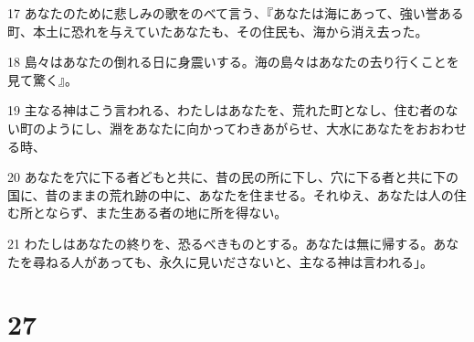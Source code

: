 \par 17 あなたのために悲しみの歌をのべて言う、『あなたは海にあって、強い誉ある町、本土に恐れを与えていたあなたも、その住民も、海から消え去った。
\par 18 島々はあなたの倒れる日に身震いする。海の島々はあなたの去り行くことを見て驚く』。
\par 19 主なる神はこう言われる、わたしはあなたを、荒れた町となし、住む者のない町のようにし、淵をあなたに向かってわきあがらせ、大水にあなたをおおわせる時、
\par 20 あなたを穴に下る者どもと共に、昔の民の所に下し、穴に下る者と共に下の国に、昔のままの荒れ跡の中に、あなたを住ませる。それゆえ、あなたは人の住む所とならず、また生ある者の地に所を得ない。
\par 21 わたしはあなたの終りを、恐るべきものとする。あなたは無に帰する。あなたを尋ねる人があっても、永久に見いださないと、主なる神は言われる」。

\chapter{27}

